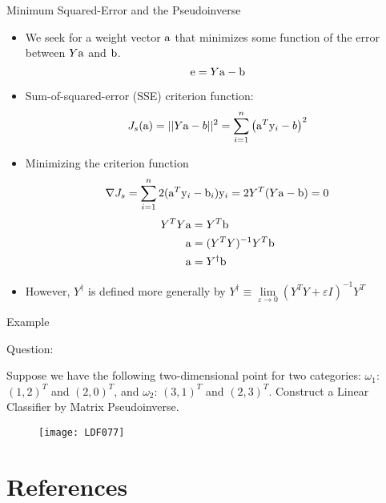 \begin{frame}{Minimum Squared-Error and the Pseudoinverse}
\vspace{-4pt}
\begin{footnotesize}
\begin{itemize}
\item We seek for a weight vector ${\rm a}$ that minimizes some function of the error between $Y{\rm a}$ and ${\rm b}$.
\[{\rm e}=Y{\rm a}-{\rm b}\]
\item Sum-of-squared-error (SSE) criterion function:
\[{J_s}({\rm a}) =||Y{\rm a}-b||^2= \sum\limits_{i = 1}^n {{{\left( {{{\rm a}^T}{{\rm y}_i} - b} \right)}^2}} \]
\item Minimizing the criterion function
\begin{align*}
  \nabla {J_s} = \sum\limits_{i = 1}^n {2({{\rm a}^T}{{\rm y}_i} - {{\rm b}_i}){{\rm y}_i}}  = 2{Y^T}(Y{\rm a} - {\rm b}) =0 
\end{align*}
\begin{align*}
  Y^TY{\rm a}&=Y^T{\rm b}\\
  {\rm a} &= (Y^TY)^{-1}Y^T{\rm b} \\
  {\rm a} &=Y^{\dagger} {\rm b}
\end{align*}
\item However, $Y^{\dagger}$ is defined more generally by $\boxed{Y^{\dagger}\equiv \mathop {\lim }\limits_{\varepsilon  \to 0} {({Y^T}Y + \varepsilon I)^{ - 1}}{Y^T}}$
\end{itemize}
\end{footnotesize}
\end{frame}
\begin{frame}{Example}

{\color{mycolor2}Question:}

Suppose we have the following two-dimensional point for two categories: $\omega_1$: $(1,2)^T$ and $(2,0)^T$, and $\omega_2$: $(3,1)^T$ and $(2,3)^T$. Construct a Linear Classifier by Matrix Pseudoinverse.
\begin{figure}
\texttt{[image: LDF077]}
\end{figure}
\end{frame}


\section{References}
